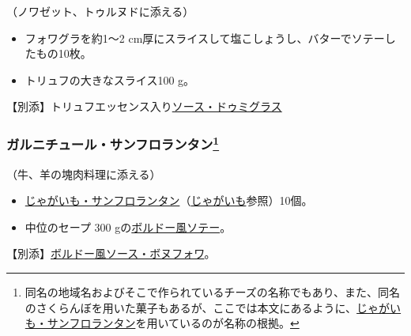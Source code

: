 \begin{recette}


（ノワゼット、トゥルヌドに添える）

\begin{itemize}
\item
  フォワグラを約1〜2
  cm厚にスライスして塩こしょうし、バターでソテーしたもの10枚。
\item
  トリュフの大きなスライス100 g。
\end{itemize}

【別添】トリュフエッセンス入り\protect\hyperlink{sauce-demi-glace}{ソース・ドゥミグラス}

\atoaki{}

\hypertarget{garniture-saint-florentin}{%
\subsubsection[ガルニチュール・サンフロランタン]{\texorpdfstring{ガルニチュール・サンフロランタン\footnote{同名の地域名およびそこで作られているチーズの名称でもあり、また、同名のさくらんぼを用いた菓子もあるが、ここでは本文にあるように、\protect\hyperlink{pommes-de-terre-saint-florentin}{じゃがいも・サンフロランタン}を用いているのが名称の根拠。}}{ガルニチュール・サンフロランタン}}\label{garniture-saint-florentin}}



（牛、羊の塊肉料理に添える）

\begin{itemize}
\item
  \protect\hyperlink{pommes-de-terre-saint-florentin}{じゃがいも・サンフロランタン}（\protect\hyperlink{pommes-de-terre}{じゃがいも}参照）10個。
\item
  中位のセープ 300
  gの\protect\hyperlink{cepes-a-la-bordelaise}{ボルドー風ソテー}。
\end{itemize}

【別添】\protect\hyperlink{sauce-bonnefoy}{ボルドー風ソース・ボヌフォワ}。


\end{recette}
